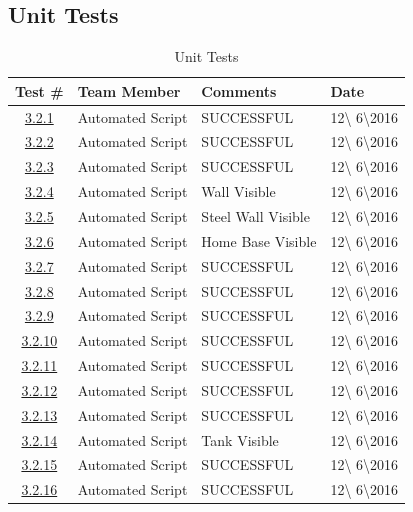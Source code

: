 \documentclass{article}
\begin{document}
\subsection{Unit Tests}
\begin{table}[H]
\caption{Unit Tests}
	\begin{tabularx}{\textwidth}{| c | l | X | l |}
	\toprule
	Test \#& Team Member &Comments &Date\\
	\midrule
	\hyperref[sec:3.2.1]{3.2.1}& Automated Script  & SUCCESSFUL & 12\textbackslash
	6\textbackslash2016\\
	\hyperref[sec:3.2.2]{3.2.2}& Automated Script  & SUCCESSFUL & 12\textbackslash
	6\textbackslash2016\\
	\hyperref[sec:3.2.3]{3.2.3}& Automated Script  & SUCCESSFUL & 12\textbackslash
	6\textbackslash2016\\
	\hyperref[sec:3.2.4]{3.2.4}& Automated Script  & Wall Visible & 12\textbackslash
	6\textbackslash2016\\
	\hyperref[sec:3.2.5]{3.2.5}& Automated Script  & Steel Wall Visible & 12\textbackslash
	6\textbackslash2016\\
	\hyperref[sec:3.2.6]{3.2.6}& Automated Script  & Home Base Visible & 12\textbackslash
	6\textbackslash2016\\
	\hyperref[sec:3.2.7]{3.2.7}& Automated Script  & SUCCESSFUL & 12\textbackslash
	6\textbackslash2016\\
	\hyperref[sec:3.2.8]{3.2.8}& Automated Script  & SUCCESSFUL & 12\textbackslash
	6\textbackslash2016\\
	\hyperref[sec:3.2.9]{3.2.9}& Automated Script  & SUCCESSFUL & 12\textbackslash
	6\textbackslash2016\\
	\hyperref[sec:3.2.10]{3.2.10}& Automated Script  & SUCCESSFUL & 12\textbackslash
	6\textbackslash2016\\
	\hyperref[sec:3.2.11]{3.2.11}& Automated Script  & SUCCESSFUL & 12\textbackslash
	6\textbackslash2016\\
	\hyperref[sec:3.2.12]{3.2.12}& Automated Script  & SUCCESSFUL & 12\textbackslash
	6\textbackslash2016\\
	\hyperref[sec:3.2.13]{3.2.13}& Automated Script  & SUCCESSFUL & 12\textbackslash
	6\textbackslash2016\\
	\hyperref[sec:3.2.14]{3.2.14}& Automated Script  & Tank Visible & 12\textbackslash
	6\textbackslash2016\\
	\hyperref[sec:3.2.15]{3.2.15}& Automated Script  & SUCCESSFUL & 12\textbackslash
	6\textbackslash2016\\
	\hyperref[sec:3.2.16]{3.2.16}& Automated Script  & SUCCESSFUL & 12\textbackslash
	6\textbackslash2016\\
	
		\bottomrule
	\end{tabularx}
\end{table}
\end{document}
